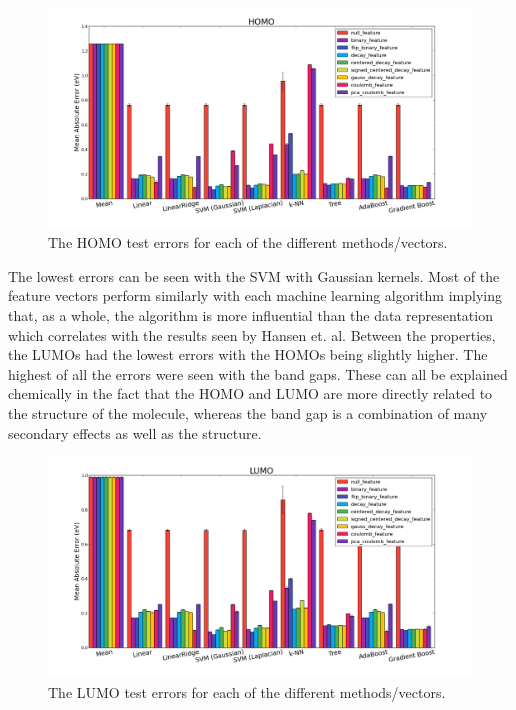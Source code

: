 \documentclass[10pt, oneside]{article}   	%
\begin{document}
\begin{figure}[H]
\begin{center}
\includegraphics [width=.8\textwidth]{homo_results.png}
\caption{The HOMO test errors for each of the different methods/vectors.}\label{homo}
\end{center}
\end{figure}

The lowest errors can be seen with the SVM with Gaussian kernels. Most of the feature vectors perform similarly with each machine learning algorithm implying that, as a whole, the algorithm is more influential than the data representation which correlates with the results seen by Hansen et. al. Between the properties, the LUMOs had the lowest errors with the HOMOs being slightly higher. The highest of all the errors were seen with the band gaps. These can all be explained chemically in the fact that the HOMO and LUMO are more directly related to the structure of the molecule, whereas the band gap is a combination of many secondary effects as well as the structure.

\begin{figure}[H]
\begin{center}
\includegraphics [width=.8\textwidth]{lumo_results.png}
\caption{The LUMO test errors for each of the different methods/vectors.}\label{lumo}
\end{center}
\end{figure}
\end{document}
